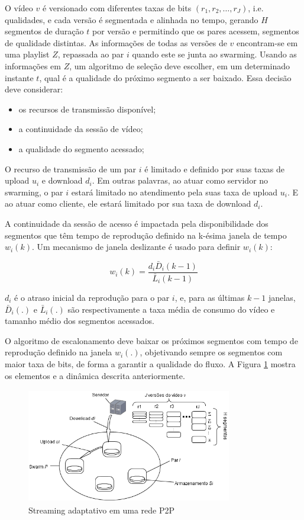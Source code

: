 \documentclass[
	12pt,
	oneside,
	a4paper,
	english,
	brazil
	]{abntex2ppgsi}
\begin{document}
O vídeo $v$ é versionado com diferentes taxas de bits $(r_1,r_2,\ldots,r_J)$, i.e. qualidades, e cada versão é segmentada e alinhada no tempo, gerando $H$ segmentos de duração $t$ por versão e permitindo que os pares acessem, segmentos de qualidade distintas. As informações de todas as versões de $v$ encontram-se em uma playlist $Z$, repassada ao par $i$ quando este se junta ao swarming. Usando as informações em $Z$, um algoritmo de seleção deve escolher, em um determinado instante $t$, qual é a qualidade do próximo segmento a ser baixado. Essa decisão deve considerar:
\begin{itemize}
\item os recursos de transmissão disponível;
\item a continuidade da sessão de vídeo;
\item a qualidade do segmento acessado;
\end{itemize} 

O recurso de transmissão de um par $i$ é limitado e definido por suas taxas de upload $u_i$ e download $d_i$. Em outras palavras, ao atuar como servidor no swarming, o par $i$ estará limitado no atendimento pela suas taxa de upload $u_i$. E ao atuar como cliente, ele estará limitado por sua taxa de download $d_i$.

A continuidade da sessão de acesso é impactada pela disponibilidade dos segmentos que têm tempo de reprodução definido na k-ésima janela de tempo $w_i(k)$. Um mecanismo de janela deslizante é usado para definir $w_i(k)$:

\begin{equation}
w_i(k) = \frac{d_i\bar{D}_i(k-1)}{\bar{L}_i(k-1)} 
\end{equation}

\noindent $d_i$ é o atraso inicial da reprodução para o par $i$, e, para as últimas $k-1$ janelas, $\bar{D}_i(.)$ e $\bar{L}_i(.)$ são respectivamente a taxa média de consumo do vídeo e tamanho médio dos segmentos acessados.

O algoritmo de escalonamento deve baixar os próximos segmentos com tempo de reprodução definido na janela $w_i(.)$, objetivando sempre os segmentos com maior taxa de bits, de forma a garantir a qualidade do fluxo.  A Figura \ref{fig:StreamingAdaptativo} mostra os elementos e a dinâmica descrita anteriormente.

\begin{figure}[H]%
	\centering
	\includegraphics[height=5cm,width=0.8\textwidth]{figuras/Streaming_swarm.png}
 	 \caption{Streaming adaptativo em uma rede P2P}
	\label{fig:StreamingAdaptativo}
\end{figure}
\end{document}
